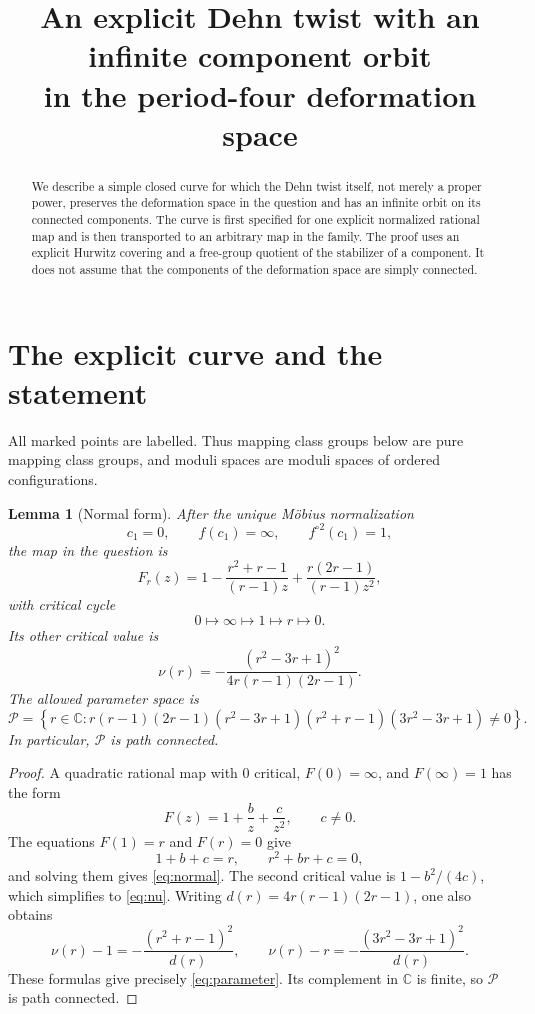 \documentclass[11pt]{article}
\title{An explicit Dehn twist with an infinite component orbit\\
in the period-four deformation space}
\author{}
\date{}
\newcommand{\C}{\mathbb C}
\newcommand{\Par}{\mathcal P}
\newtheorem{lemma}[theorem]{Lemma}
\theoremstyle{definition}
\theoremstyle{remark}
\begin{document}
\maketitle

\begin{abstract}
We describe a simple closed curve for which the Dehn twist itself,
not merely a proper power, preserves the deformation space in the
question and has an infinite orbit on its connected components.
The curve is first specified for one explicit normalized rational map
and is then transported to an arbitrary map in the family.
The proof uses an explicit Hurwitz covering and a free-group quotient
of the stabilizer of a component.  It does not assume that the
components of the deformation space are simply connected.
\end{abstract}

\section{The explicit curve and the statement}

All marked points are labelled.  Thus mapping class groups below are
pure mapping class groups, and moduli spaces are moduli spaces of
ordered configurations.

\begin{lemma}[Normal form]\label{lem:normal}
After the unique M\"obius normalization
\[
c_1=0,\qquad f(c_1)=\infty,\qquad f^{\circ 2}(c_1)=1,
\]
the map in the question is
\begin{equation}\label{eq:normal}
F_r(z)=
1-\frac{r^2+r-1}{(r-1)z}
+\frac{r(2r-1)}{(r-1)z^2},
\end{equation}
with critical cycle
\[
0\longmapsto\infty\longmapsto1\longmapsto r\longmapsto0.
\]
Its other critical value is
\begin{equation}\label{eq:nu}
\nu(r)=
-\frac{(r^2-3r+1)^2}{4r(r-1)(2r-1)}.
\end{equation}
The allowed parameter space is
\begin{equation}\label{eq:parameter}
\Par=
\left\{
r\in\C:
r(r-1)(2r-1)
(r^2-3r+1)(r^2+r-1)(3r^2-3r+1)\ne0
\right\}.
\end{equation}
In particular, $\Par$ is path connected.
\end{lemma}

\begin{proof}
A quadratic rational map with $0$ critical, $F(0)=\infty$, and
$F(\infty)=1$ has the form
\[
F(z)=1+\frac b z+\frac c{z^2},\qquad c\ne0.
\]
The equations $F(1)=r$ and $F(r)=0$ give
\[
1+b+c=r,\qquad r^2+br+c=0,
\]
and solving them gives \eqref{eq:normal}.  The second critical value is
$1-b^2/(4c)$, which simplifies to \eqref{eq:nu}.
Writing $d(r)=4r(r-1)(2r-1)$, one also obtains
\[
\nu(r)-1=-\frac{(r^2+r-1)^2}{d(r)},\qquad
\nu(r)-r=-\frac{(3r^2-3r+1)^2}{d(r)}.
\]
These formulas give precisely \eqref{eq:parameter}.  Its complement
in $\C$ is finite, so $\Par$ is path connected.
\end{proof}
\end{document}
